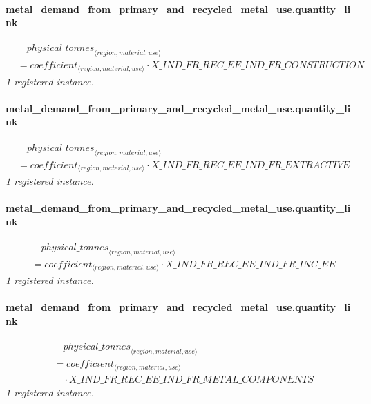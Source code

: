 \documentclass[11pt]{article}
\begin{document}
\paragraph{metal\_demand\_from\_primary\_and\_recycled\_metal\_use.quantity\_link}
\begin{align*}
&\quad {physical\_tonnes}_{\langle region, material, use\rangle}\\
&= coefficient_{\langle region, material, use\rangle} \cdot X\_IND\_FR\_REC\_EE\_IND\_FR\_CONSTRUCTION
\end{align*}
\noindent\emph{1 registered instance.}\par
\paragraph{metal\_demand\_from\_primary\_and\_recycled\_metal\_use.quantity\_link}
\begin{align*}
&\quad {physical\_tonnes}_{\langle region, material, use\rangle}\\
&= coefficient_{\langle region, material, use\rangle} \cdot X\_IND\_FR\_REC\_EE\_IND\_FR\_EXTRACTIVE
\end{align*}
\noindent\emph{1 registered instance.}\par
\paragraph{metal\_demand\_from\_primary\_and\_recycled\_metal\_use.quantity\_link}
\begin{align*}
&\quad {physical\_tonnes}_{\langle region, material, use\rangle}\\
&= coefficient_{\langle region, material, use\rangle} \cdot X\_IND\_FR\_REC\_EE\_IND\_FR\_INC\_EE
\end{align*}
\noindent\emph{1 registered instance.}\par
\paragraph{metal\_demand\_from\_primary\_and\_recycled\_metal\_use.quantity\_link}
\begin{align*}
&\quad {physical\_tonnes}_{\langle region, material, use\rangle}\\
&= coefficient_{\langle region, material, use\rangle}\\
&\quad {}\cdot X\_IND\_FR\_REC\_EE\_IND\_FR\_METAL\_COMPONENTS
\end{align*}
\noindent\emph{1 registered instance.}\par
\end{document}
